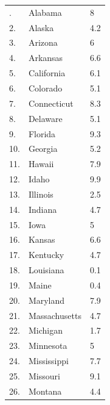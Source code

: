 \documentclass[
  letterpaper,
  DIV=11,
  numbers=noendperiod]{scrreprt}
\begin{document}
\begin{longtable}[]{@{}lll@{}}
\toprule\noalign{}
\endhead
\bottomrule\noalign{}
\endlastfoot
1. & Alabama & 8 \\
2. & Alaska & 4.2 \\
3. & Arizona & 6 \\
4. & Arkansas & 6.6 \\
5. & California & 6.1 \\
6. & Colorado & 5.1 \\
7. & Connecticut & 8.3 \\
8. & Delaware & 5.1 \\
9. & Florida & 9.3 \\
10. & Georgia & 5.2 \\
11. & Hawaii & 7.9 \\
12. & Idaho & 9.9 \\
13. & Illinois & 2.5 \\
14. & Indiana & 4.7 \\
15. & Iowa & 5 \\
16. & Kansas & 6.6 \\
17. & Kentucky & 4.7 \\
18. & Louisiana & 0.1 \\
19. & Maine & 0.4 \\
20. & Maryland & 7.9 \\
21. & Massachusetts & 4.7 \\
22. & Michigan & 1.7 \\
23. & Minnesota & 5 \\
24. & Mississippi & 7.7 \\
25. & Missouri & 9.1 \\
26. & Montana & 4.4 \\
\end{longtable}
\end{document}
